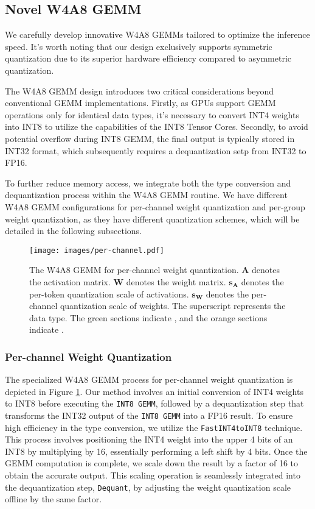 \subsection{Novel W4A8 GEMM}
We carefully develop innovative W4A8 GEMMs tailored to optimize the inference speed. It's worth noting that our design exclusively supports symmetric quantization due to its superior hardware efficiency compared to asymmetric quantization.

The W4A8 GEMM design introduces two critical considerations beyond conventional GEMM implementations.
Firstly, as GPUs support GEMM operations only for identical data types, it's necessary to convert INT4 weights into INT8 to utilize the capabilities of the INT8 Tensor Cores.
Secondly, to avoid potential overflow during INT8 GEMM, the final output is typically stored in INT32 format, which subsequently requires a dequantization setp from INT32 to FP16.

To further reduce memory access, we integrate both the type conversion and dequantization process within the W4A8 GEMM routine.
We have different W4A8 GEMM configurations for per-channel weight quantization and per-group weight quantization, as they have different quantization schemes, which will be detailed in the following subsections.

\begin{figure}[ht]
\centering
\texttt{[image: images/per-channel.pdf]}
\caption{The W4A8 GEMM for per-channel weight quantization. $\mathbf{A}$ denotes the activation matrix. $\mathbf{W}$ denotes the weight matrix. $\mathbf{s_A}$ denotes the per-token quantization scale of activations. $\mathbf{s_W}$ denotes the per-channel quantization scale of weights. The superscript represents the data type. The green sections indicate , and the orange sections indicate .}
\label{fig:fig3}
\vspace{-0.1in}
\end{figure}

\subsubsection{Per-channel Weight Quantization}
The specialized W4A8 GEMM process for per-channel weight quantization is depicted in Figure \ref{fig:fig3}. Our method involves an initial conversion of INT4 weights to INT8 before executing the \texttt{INT8 GEMM}, followed by a dequantization step that transforms the INT32 output of the \texttt{INT8 GEMM} into a FP16 result. To ensure high efficiency in the type conversion, we utilize the \texttt{FastINT4toINT8} \citep{li2023speed} technique. This process involves positioning the INT4 weight into the upper 4 bits of an INT8 by multiplying by 16, essentially performing a left shift by 4 bits. Once the GEMM computation is complete, we scale down the result by a factor of 16 to obtain the accurate output. This scaling operation is seamlessly integrated into the dequantization step, \texttt{Dequant}, by adjusting the weight quantization scale offline by the same factor. 

